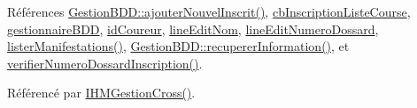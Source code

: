 Références \hyperlink{class_gestion_b_d_d_a71391d5419969b52cd999463b5326599}{Gestion\+B\+D\+D\+::ajouter\+Nouvel\+Inscrit()}, \hyperlink{class_i_h_m_gestion_cross_aff44e6f1a225ee5b55783afe72049f83}{cb\+Inscription\+Liste\+Course}, \hyperlink{class_i_h_m_gestion_cross_a440bac63a3e51db3e2c08e883f8cafc9}{gestionnaire\+B\+DD}, \hyperlink{class_i_h_m_gestion_cross_a9352a649126c14e7d0da3694c10c3cef}{id\+Coureur}, \hyperlink{class_i_h_m_gestion_cross_a633102626c5dedd575b51a1ba5c6e708}{line\+Edit\+Nom}, \hyperlink{class_i_h_m_gestion_cross_adeb4cfc9a218c06fca5cabc280a611e2}{line\+Edit\+Numero\+Dossard}, \hyperlink{class_i_h_m_gestion_cross_a0eadd8592c966c89bf7b5a25a0ae7589}{lister\+Manifestations()}, \hyperlink{class_gestion_b_d_d_a0a2fa02b90974684658937fbfb55bf0a}{Gestion\+B\+D\+D\+::recuperer\+Information()}, et \hyperlink{class_i_h_m_gestion_cross_a164be2d046cf18ee03e3939d03a5580d}{verifier\+Numero\+Dossard\+Inscription()}.



Référencé par \hyperlink{class_i_h_m_gestion_cross_a2c62fd83326a87456a403f46acc408c8}{I\+H\+M\+Gestion\+Cross()}.


